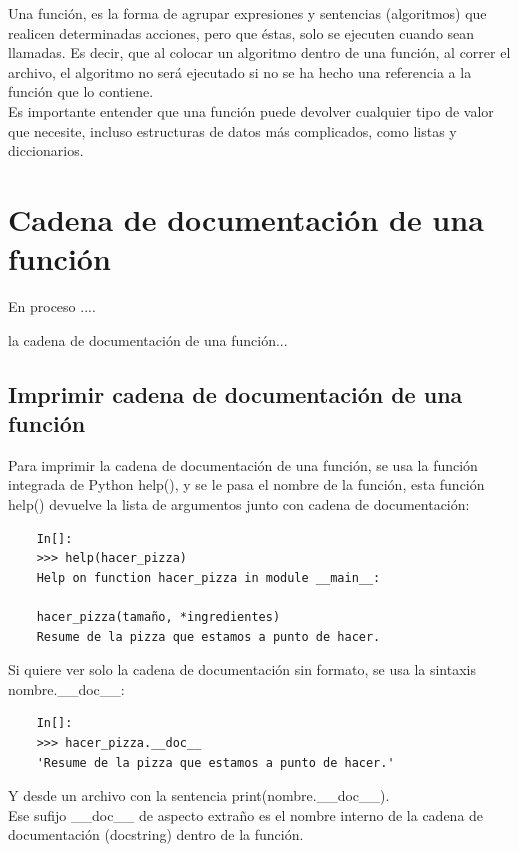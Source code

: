 Una función, es la forma de agrupar expresiones y sentencias (algoritmos) que realicen
determinadas acciones, pero que éstas, solo se ejecuten cuando sean llamadas. Es decir,
que al colocar un algoritmo dentro de una función, al correr el archivo, el algoritmo no será
ejecutado si no se ha hecho una referencia a la función que lo contiene.\\


Es importante entender que una función puede devolver cualquier tipo de valor que necesite, incluso estructuras de datos más complicados, como listas y diccionarios. 

\section{Cadena de documentación de una función}

En proceso ....

la cadena de documentación de una función...

\subsection{Imprimir cadena de documentación de una función}

Para imprimir la cadena de documentación de una función, se usa la función integrada  de Python  {\ttfamily help()}, y se le pasa el nombre de la función, esta función {\ttfamily help()} devuelve la lista de argumentos junto con cadena de documentación:

\begin{lstlisting}
	In[]:
	>>> help(hacer_pizza)
	Help on function hacer_pizza in module __main__:
	
	hacer_pizza(tamaño, *ingredientes)
	Resume de la pizza que estamos a punto de hacer.
\end{lstlisting}

Si quiere ver solo la cadena de documentación sin formato, se usa la sintaxis {nombre.\_\!\!\_doc\_\!\!\_}:

\begin{lstlisting}
	In[]:
	>>> hacer_pizza.__doc__
	'Resume de la pizza que estamos a punto de hacer.'
\end{lstlisting}

Y desde un archivo con la sentencia  {\ttfamily print(nombre.\_\!\!\_doc\_\!\!\_)}.\\

Ese sufijo {\ttfamily \_\!\!\_doc\_\!\!\_} de aspecto extraño es el nombre interno de la cadena de documentación (docstring) dentro de la función. 


